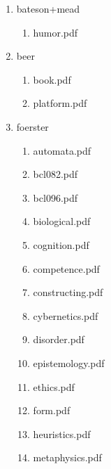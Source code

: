 \documentclass[11pt]{article}
\begin{document}
\begin{enumerate}
\item bateson+mead
\label{sec-1-1-1-1-18-18}
\begin{enumerate}
\item humor.pdf
\label{sec-1-1-1-1-18-18-1}
\end{enumerate}

\item beer
\label{sec-1-1-1-1-18-19}
\begin{enumerate}
\item book.pdf
\label{sec-1-1-1-1-18-19-1}

\item platform.pdf
\label{sec-1-1-1-1-18-19-2}
\end{enumerate}

\item foerster
\label{sec-1-1-1-1-18-20}
\begin{enumerate}
\item automata.pdf
\label{sec-1-1-1-1-18-20-1}

\item bcl082.pdf
\label{sec-1-1-1-1-18-20-2}

\item bcl096.pdf
\label{sec-1-1-1-1-18-20-3}

\item biological.pdf
\label{sec-1-1-1-1-18-20-4}

\item cognition.pdf
\label{sec-1-1-1-1-18-20-5}

\item competence.pdf
\label{sec-1-1-1-1-18-20-6}

\item constructing.pdf
\label{sec-1-1-1-1-18-20-7}

\item cybernetics.pdf
\label{sec-1-1-1-1-18-20-8}

\item disorder.pdf
\label{sec-1-1-1-1-18-20-9}

\item epistemology.pdf
\label{sec-1-1-1-1-18-20-10}

\item ethics.pdf
\label{sec-1-1-1-1-18-20-11}

\item form.pdf
\label{sec-1-1-1-1-18-20-12}

\item heuristics.pdf
\label{sec-1-1-1-1-18-20-13}

\item metaphysics.pdf
\label{sec-1-1-1-1-18-20-14}


\end{enumerate}
\end{enumerate}
\end{document}
